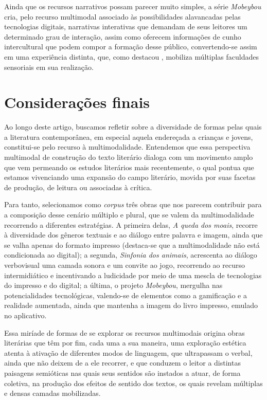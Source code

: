 \documentclass[portuguese]{textolivre}
\begin{document}
Ainda que os recursos narrativos possam parecer muito simples, a série
\textit{Mobeybou} cria, pelo recurso multimodal associado às possibilidades
alavancadas pelas tecnologias digitais, narrativas interativas que demandam de
seus leitores um determinado grau de interação, assim como oferecem informações
de cunho intercultural que podem compor a formação desse público,
convertendo-se assim em uma experiência distinta, que, como destacou
\textcite{ellestrom_modalities_2021}, mobiliza múltiplas faculdades sensoriais
em sua realização.

\section{Considerações finais}\label{sec-modelo}

Ao longo deste artigo, buscamos refletir sobre a diversidade de formas pelas
quais a literatura contemporânea, em especial aquela endereçada a crianças e
jovens, constitui-se pelo recurso à multimodalidade. Entendemos que essa
perspectiva multimodal de construção do texto literário dialoga com um
movimento amplo que vem permeando os estudos literários mais recentemente, o
qual pontua que estamos vivenciando uma expansão do campo literário, movida por
suas facetas de produção, de leitura ou associadas à crítica.

Para tanto, selecionamos como \textit{corpus} três obras que nos parecem
contribuir para a composição desse cenário múltiplo e plural, que se valem da
multimodalidade recorrendo a diferentes estratégias. A primeira delas,
\textit{A queda dos moais}, recorre à diversidade dos gêneros textuais e ao
diálogo entre palavra e imagem, ainda que se valha apenas do formato impresso
(destaca-se que a multimodalidade não está condicionada ao digital); a segunda,
\textit{Sinfonia dos animais}, acrescenta ao diálogo verbovisual uma camada
sonora e um convite ao jogo, recorrendo ao recurso intermidiático e
incentivando a ludicidade por meio de uma mescla de tecnologias do impresso e
do digital; a última, o projeto \textit{Mobeybou}, mergulha nas potencialidades
tecnológicas, valendo-se de elementos como a gamificação e a realidade
aumentada, ainda que mantenha a imagem do livro impresso, emulado no
aplicativo.

Essa miríade de formas de se explorar os recursos multimodais origina obras
literárias que têm por fim, cada uma a sua maneira, uma exploração estética
atenta à ativação de diferentes modos de linguagem, que ultrapassam o verbal,
ainda que não deixem de a ele recorrer, e que conduzem o leitor a distintas
paisagens semióticas nas quais seus sentidos são instados a atuar, de forma
coletiva, na produção dos efeitos de sentido dos textos, os quais revelam
múltiplas e densas camadas mobilizadas. 
\end{document}
